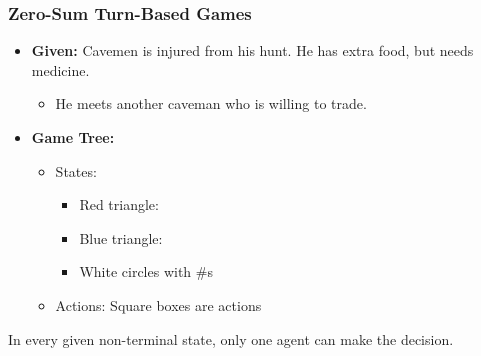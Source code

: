 \subsubsection{Zero-Sum Turn-Based Games}
\begin{example}
    \begin{itemize}
        \item \textbf{Given:} Cavemen is injured from his hunt. He has extra food, but needs medicine.
        \begin{itemize}
            \item He meets another caveman who is willing to trade. 
        \end{itemize} 
        \item \textbf{Game Tree:}
        \begin{itemize}
            \item States:
            \begin{itemize}
                \item Red triangle:
                \item Blue triangle: 
                \item White circles with \#s
            \end{itemize}
            \item Actions: Square boxes are actions
        \end{itemize}
    \end{itemize}
\end{example}

\begin{warning}
    In every given non-terminal state, only one agent can make the decision. 
\end{warning}
